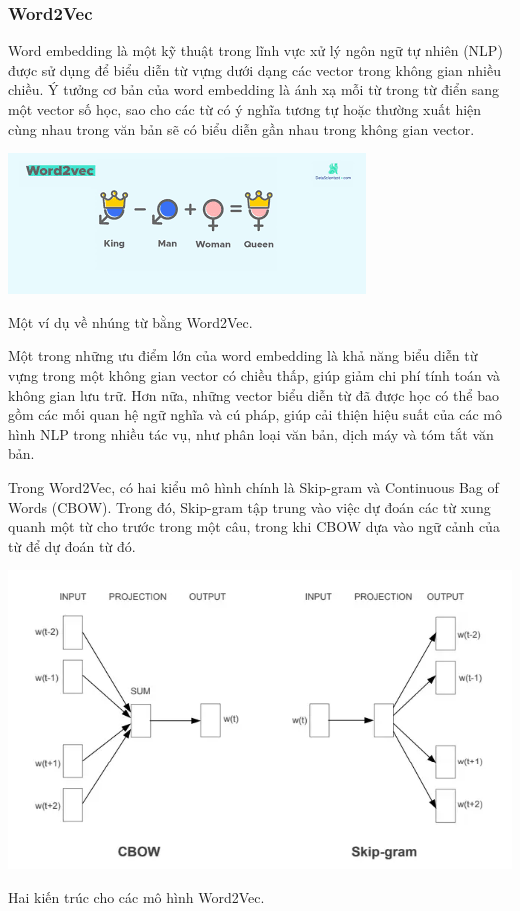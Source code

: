 \documentclass[a4paper, 12pt, openany]{book}
\begin{document}
\subsubsection{Word2Vec}
Word embedding là một kỹ thuật trong lĩnh vực xử lý ngôn ngữ tự nhiên (NLP) được sử dụng để biểu diễn từ vựng dưới dạng các vector trong không gian nhiều chiều. Ý tưởng cơ bản của word embedding là ánh xạ mỗi từ trong từ điển sang một vector số học, sao cho các từ có ý nghĩa tương tự hoặc thường xuất hiện cùng nhau trong văn bản sẽ có biểu diễn gần nhau trong không gian vector.

\begin{minipage}{\linewidth}
    \captionsetup{type=figure}
    \centering
    \includegraphics[width=.8\linewidth]{./assets/images/word2vec-intro.png}
    \caption{Một ví dụ về nhúng từ bằng Word2Vec.}
\end{minipage}
\vspace{0.5cm}

Một trong những ưu điểm lớn của word embedding là khả năng biểu diễn từ vựng trong một không gian vector có chiều thấp, giúp giảm chi phí tính toán và không gian lưu trữ. Hơn nữa, những vector biểu diễn từ đã được học có thể bao gồm các mối quan hệ ngữ nghĩa và cú pháp, giúp cải thiện hiệu suất của các mô hình NLP trong nhiều tác vụ, như phân loại văn bản, dịch máy và tóm tắt văn bản.

Trong Word2Vec, có hai kiểu mô hình chính là Skip-gram và Continuous Bag of Words (CBOW). Trong đó, Skip-gram tập trung vào việc dự đoán các từ xung quanh một từ cho trước trong một câu, trong khi CBOW dựa vào ngữ cảnh của từ để dự đoán từ đó.

\begin{minipage}{\linewidth}
    \captionsetup{type=figure}
    \centering
    \includegraphics[width=\linewidth]{./assets/images/word2vec.png}
    \caption{Hai kiến trúc cho các mô hình Word2Vec.}
\end{minipage}
\vspace{0.5cm}
\end{document}
